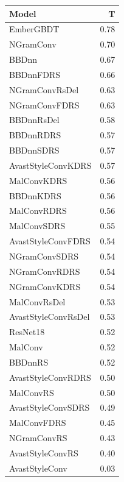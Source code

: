 \begin{tabular}{lr}
\toprule
Model & T \\
\midrule
EmberGBDT & 0.78 \\
NGramConv & 0.70 \\
BBDnn & 0.67 \\
BBDnnFDRS & 0.66 \\
NGramConvRsDel & 0.63 \\
NGramConvFDRS & 0.63 \\
BBDnnRsDel & 0.58 \\
BBDnnRDRS & 0.57 \\
BBDnnSDRS & 0.57 \\
AvastStyleConvKDRS & 0.57 \\
MalConvKDRS & 0.56 \\
BBDnnKDRS & 0.56 \\
MalConvRDRS & 0.56 \\
MalConvSDRS & 0.55 \\
AvastStyleConvFDRS & 0.54 \\
NGramConvSDRS & 0.54 \\
NGramConvRDRS & 0.54 \\
NGramConvKDRS & 0.54 \\
MalConvRsDel & 0.53 \\
AvastStyleConvRsDel & 0.53 \\
ResNet18 & 0.52 \\
MalConv & 0.52 \\
BBDnnRS & 0.52 \\
AvastStyleConvRDRS & 0.50 \\
MalConvRS & 0.50 \\
AvastStyleConvSDRS & 0.49 \\
MalConvFDRS & 0.45 \\
NGramConvRS & 0.43 \\
AvastStyleConvRS & 0.40 \\
AvastStyleConv & 0.03 \\
\bottomrule
\end{tabular}
